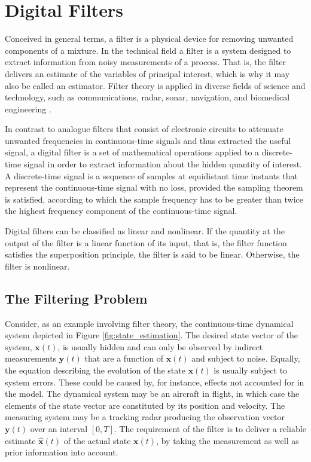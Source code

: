 \chapter{Digital Filters}
\label{ch:digital_filters}

Conceived in general terms, a filter is a physical device for removing unwanted components of a mixture. In the technical field a filter is a system designed to extract information from noisy measurements of a process. That is, the filter delivers an estimate of the variables of principal interest, which is why it may also be called an estimator. Filter theory is applied in diverse fields of science and technology, such as communications, radar, sonar, navigation, and biomedical engineering \cite{haykin2002adaptive}.

In contrast to analogue filters that consist of electronic circuits to attenuate unwanted frequencies in continuous-time signals and thus extracted the useful signal, a digital filter is a set of mathematical operations applied to a discrete-time signal in order to extract information about the hidden quantity of interest. A discrete-time signal is a sequence of samples at equidistant time instants that represent the continuous-time signal with no loss, provided the sampling theorem is satisfied, according to which the sample frequency has to be greater than twice the highest frequency component of the continuous-time signal.

Digital filters can be classified as linear and nonlinear. If the quantity at the output of the filter is a linear function of its input, that is, the filter function satisfies the superposition principle, the filter is said to be linear. Otherwise, the filter is nonlinear.

\section{The Filtering Problem}

Consider, as an example involving filter theory, the continuous-time dynamical system depicted in Figure \ref{fig:state_estimation}. The desired state vector of the system, $\mathbf{x}(t)$, is usually hidden and can only be observed by indirect measurements $\mathbf{y}(t)$ that are a function of $\mathbf{x}(t)$ and subject to noise. Equally, the equation describing the evolution of the state $\mathbf{x}(t)$ is usually subject to system errors. These could be caused by, for instance, effects not accounted for in the model. The dynamical system may be an aircraft in flight, in which case the elements of the state vector are constituted by its position and velocity. The measuring system may be a tracking radar producing the observation vector $\mathbf{y}(t)$ over an interval $[0, T]$. The requirement of the filter is to deliver a reliable estimate $\hat{\mathbf{x}}(t)$ of the actual state $\mathbf{x}(t)$, by taking the measurement as well as prior information into account.

